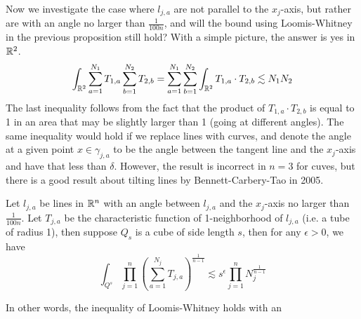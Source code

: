 Now we investigate the case where $l_{j,a}$ are not parallel to the $x_j$-axis, but rather are with an angle no larger than $\frac{1}{100n}$, and will the bound using Loomis-Whitney in the previous proposition still hold? With a simple picture, the answer is yes in $\mathbb{R}^2$.
\begin{equation*}
    \int_{\mathbb{R}^2}\sum_{a=1}^{N_1}T_{1,a}\sum_{b=1}^{N_2}T_{2,b}=\sum_{a=1}^{N_1}\sum_{b=1}^{N_2}\int_{\mathbb{R}^2}T_{1,a}\cdot T_{2,b}\lesssim N_1N_2
\end{equation*}
The last inequality follows from the fact that the product of $T_{1,a}\cdot T_{2,b}$ is equal to 1 in an area that may be slightly larger than 1 (going at different angles). The same inequality would hold if we replace lines with curves, and denote the angle at a given point $x\in\gamma_{j,a}$ to be the angle between the tangent line and the $x_j$-axis and have that less than $\delta$. However, the result is incorrect in $n=3$ for cuves, but there is a good result about tilting lines by Bennett-Carbery-Tao in 2005.

\begin{theorem}
    Let $l_{j,a}$ be lines in $\mathbb{R}^n$ with an angle between $l_{j,a}$ and the $x_j$-axis no larger than $\frac{1}{100n}$. Let $T_{j,a}$ be the characteristic function of 1-neighborhood of $l_{j,a}$ (i.e. a tube of radius 1), then suppose $Q_s$ is a cube of side length $s$, then for any $\epsilon>0$, we have
    \begin{equation*}
        \int_{Q^s}\prod_{j=1}^n\left(\sum_{a=1}^{N_j}T_{j,a}\right)^{\frac{1}{n-1}}\lesssim s^\epsilon\prod_{j=1}^nN_j^{\frac{1}{n-1}}
    \end{equation*}
\end{theorem}
In other words, the inequality of Loomis-Whitney holds with an 